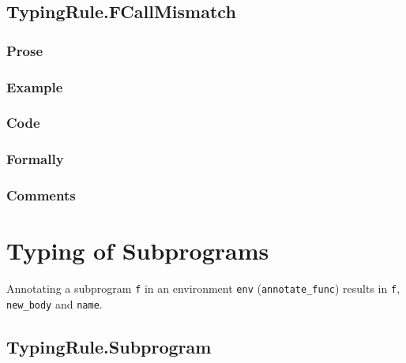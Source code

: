 \documentclass{book}
\begin{document}
\section{TypingRule.FCallMismatch \label{sec:TypingRule.FCallMismatch}}

  \subsection{Prose}

  \subsection{Example}

  \subsection{Code}

  \subsection{Formally}

  \subsection{Comments}

\chapter{Typing of Subprograms}

Annotating a subprogram \texttt{f} in an environment \texttt{env}
(\texttt{annotate\_func}) results in \texttt{f}, \texttt{new\_body} and
\texttt{name}.

\section{TypingRule.Subprogram \label{sec:TypingRule.Subprogram}}
\end{document}
